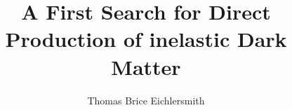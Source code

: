 

\phd %

%
\title{\bf A First Search for Direct Production of inelastic Dark Matter}
\author{Thomas Brice Eichlersmith}


\abstract{}

\copyrightpage       %

\acknowledgements{}
\dedication{}


\beforepreface

\figurespage
\tablespage

\afterpreface
